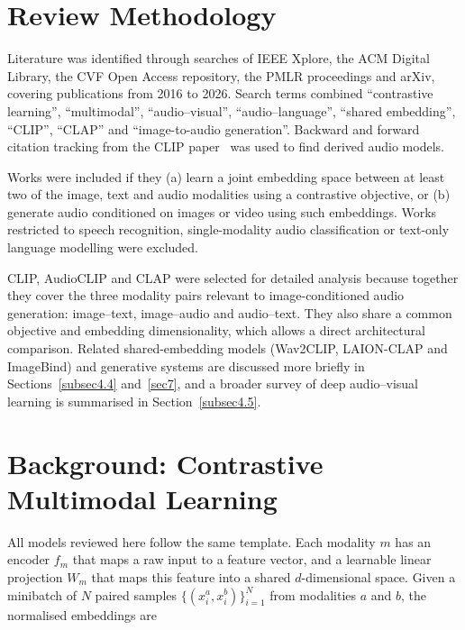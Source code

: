 \documentclass[pdflatex,sn-mathphys-num]{sn-jnl}%
\theoremstyle{thmstyleone}%
\theoremstyle{thmstyletwo}%
\theoremstyle{thmstylethree}%
\begin{document}

\section{Review Methodology}\label{sec2}

Literature was identified through searches of IEEE Xplore, the ACM Digital Library, the CVF Open Access repository, the PMLR proceedings and arXiv, covering publications from 2016 to 2026. Search terms combined ``contrastive learning'', ``multimodal'', ``audio--visual'', ``audio--language'', ``shared embedding'', ``CLIP'', ``CLAP'' and ``image-to-audio generation''. Backward and forward citation tracking from the CLIP paper~\cite{radford2021clip} was used to find derived audio models.

Works were included if they (a) learn a joint embedding space between at least two of the image, text and audio modalities using a contrastive objective, or (b) generate audio conditioned on images or video using such embeddings. Works restricted to speech recognition, single-modality audio classification or text-only language modelling were excluded.

CLIP, AudioCLIP and CLAP were selected for detailed analysis because together they cover the three modality pairs relevant to image-conditioned audio generation: image--text, image--audio and audio--text. They also share a common objective and embedding dimensionality, which allows a direct architectural comparison. Related shared-embedding models (Wav2CLIP, LAION-CLAP and ImageBind) and generative systems are discussed more briefly in Sections~\ref{subsec4.4} and~\ref{sec7}, and a broader survey of deep audio--visual learning is summarised in Section~\ref{subsec4.5}.

\section{Background: Contrastive Multimodal Learning}\label{sec3}

All models reviewed here follow the same template. Each modality $m$ has an encoder $f_m$ that maps a raw input to a feature vector, and a learnable linear projection $W_m$ that maps this feature into a shared $d$-dimensional space. Given a minibatch of $N$ paired samples $\{(x^{a}_i, x^{b}_i)\}_{i=1}^{N}$ from modalities $a$ and $b$, the normalised embeddings are
\end{document}
